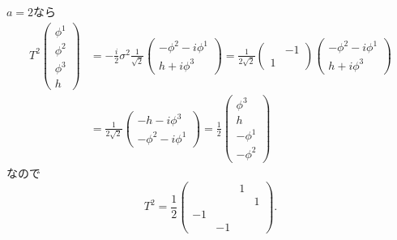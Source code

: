 \(a=2\)なら
\begin{align*}
  T^2
  \begin{pmatrix}
    \phi^1 \\ \phi^2 \\ \phi^3 \\ h
  \end{pmatrix}
  &= - \frac{i}{2} \sigma^2
  \frac{1}{\sqrt{2}}
  \begin{pmatrix}
    -\phi^2 - i \phi^1 \\
    h + i\phi^3
  \end{pmatrix}
  = \frac{1}{2\sqrt{2}}
  \begin{pmatrix}
    & -1 \\ 1 &
  \end{pmatrix}
  \begin{pmatrix}
    -\phi^2 - i \phi^1 \\
    h + i\phi^3
  \end{pmatrix}
  \\
  &= \frac{1}{2\sqrt{2}}
  \begin{pmatrix}
    -h - i\phi^3 \\
    -\phi^2 - i \phi^1
  \end{pmatrix}
  = \frac{1}{2}
  \begin{pmatrix}
    \phi^3 \\ h \\ -\phi^1 \\ -\phi^2
  \end{pmatrix}
\end{align*}
なので
\[
T^2 = \frac{1}{2}
\begin{pmatrix}
  & & 1 & \\ & & & 1 \\ -1 & & & \\ & -1 & &
\end{pmatrix}
.
\]

